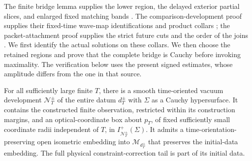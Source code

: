 The finite bridge lemma supplies the lower region, the delayed exterior
partial slices, and enlarged fixed matching bands
\cite[]{Foundation}.
The comparison-development proof supplies their fixed-time wave-map
identifications and product collars
\cite[]{Foundation}; the
packet-attachment proof supplies the strict future cuts and the order
of the joins
\cite[]{Foundation}.
We first identify the actual solutions on these collars. We then choose
the retained regions and prove that the complete bridge is Cauchy before
invoking maximality. The verification below uses the present signed
estimates, whose amplitude differs from the one in that source.

\begin{proposition}\label{attach:development}
For all sufficiently large finite $T$, there is a smooth time-oriented
vacuum development $\mathcal N_T^\pm$ of the entire datum $d_T^\pm$
with $\Sigma$ as a Cauchy hypersurface. It contains the constructed
finite observation, restricted within its construction margins, and
an optical-coordinate box about $p_T$, of fixed sufficiently small
coordinate radii independent of $T$, in
$I^+_{\mathcal N_T^\pm}(\Sigma)$.
It admits a time-orientation-preserving open isometric embedding into
$\mathcal M_{d_T^\pm}$ that preserves the initial-data embedding.
The full physical constraint-correction tail is part of its initial
data.
\end{proposition}

